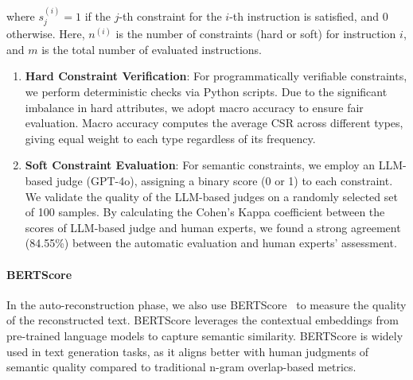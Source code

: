 where $s_j^{(i)}=1$ if the $j$-th constraint for the $i$-th instruction is satisfied, and 0 otherwise. Here, $n^{(i)}$ is the number of constraints (hard or soft) for instruction $i$, and $m$ is the total number of evaluated instructions.
\begin{enumerate}
    \item \textbf{Hard Constraint Verification}: For programmatically verifiable constraints, we perform deterministic checks via Python scripts. Due to the significant imbalance in hard attributes, we adopt macro accuracy to ensure fair evaluation. Macro accuracy computes the average CSR across different types, giving equal weight to each type regardless of its frequency.
    
    \item \textbf{Soft Constraint Evaluation}: For semantic constraints, we employ an LLM-based judge (GPT-4o), assigning a binary score (0 or 1) to each constraint. 
    We validate the quality of the LLM-based judges on a randomly selected set of 100 samples. By calculating the Cohen’s Kappa coefficient between the scores of LLM-based judge and human experts, we found a strong agreement (84.55\%) between the automatic evaluation and human experts' assessment. 

\end{enumerate}

\paragraph{BERTScore} 
In the auto-reconstruction phase, we also use BERTScore~\cite{bertscore} to measure the quality of the reconstructed text. BERTScore leverages the contextual embeddings from pre-trained language models to capture semantic similarity. BERTScore is widely used in text generation tasks, as it aligns better with human judgments of semantic quality compared to traditional n-gram overlap-based metrics.

